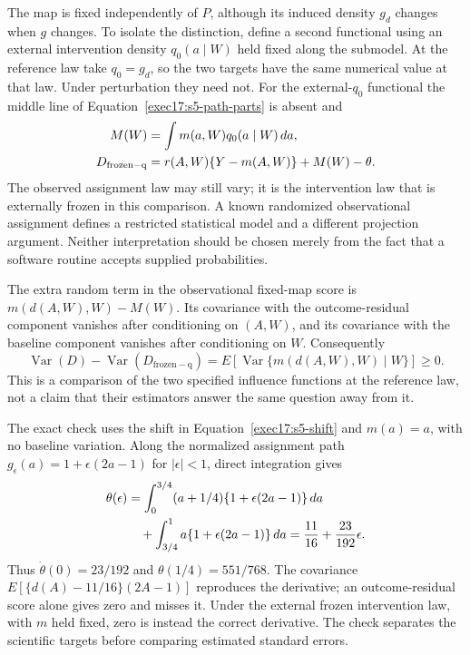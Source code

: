 The map is fixed independently of $P$, although its induced density $g_d$
changes when $g$ changes. To isolate the distinction, define a second
functional using an external intervention density $q_0(a\mid W)$ held fixed
along the submodel. At the reference law take $q_0=g_d$, so the two targets
have the same numerical value at that law. Under perturbation they need not.
For the external-$q_0$ functional the middle line of
Equation~\eqref{exec17:s5-path-parts} is absent and
\begin{align}
 M(W)&=\int m(a,W)q_0(a\mid W)\,da,\notag\\
 D_{\mathrm{frozen-q}}&=r(A,W)\{Y-m(A,W)\}+M(W)-\theta.
 \label{exec17:s5-frozen-if}
\end{align}
The observed assignment law may still vary; it is the intervention law that
is externally frozen in this comparison. A known randomized observational
assignment defines a restricted statistical model and a different
projection argument. Neither interpretation should be chosen merely from
the fact that a software routine accepts supplied probabilities.

The extra random term in the observational fixed-map score is
$m(d(A,W),W)-M(W)$. Its covariance with the outcome-residual component
vanishes after conditioning on $(A,W)$, and its covariance with the
baseline component vanishes after conditioning on $W$. Consequently
\begin{equation}
 \operatorname{Var}(D)-\operatorname{Var}(D_{\mathrm{frozen-q}})
 =E\!\left[\operatorname{Var}\{m(d(A,W),W)\mid W\}\right]\geq0.
 \label{exec17:s5-assignment-variance}
\end{equation}
This is a comparison of the two specified influence functions at the reference
law, not a claim that their estimators answer the same question away from it.

The exact check uses the shift in Equation~\eqref{exec17:s5-shift} and
$m(a)=a$, with no baseline variation. Along the normalized assignment path
$g_\epsilon(a)=1+\epsilon(2a-1)$ for $|\epsilon|<1$, direct integration gives
\begin{align}
 \theta(\epsilon)
 &=\int_0^{3/4}(a+1/4)\{1+\epsilon(2a-1)\}\,da\notag\\
 &\quad+\int_{3/4}^1 a\{1+\epsilon(2a-1)\}\,da
   =\frac{11}{16}+\frac{23}{192}\epsilon .
 \label{exec17:s5-assignment-path}
\end{align}
Thus $\dot\theta(0)=23/192$ and $\theta(1/4)=551/768$. The covariance
$E[\{d(A)-11/16\}(2A-1)]$ reproduces the derivative; an outcome-residual
score alone gives zero and misses it. Under the external frozen intervention
law, with $m$ held fixed, zero is instead the correct derivative. The check
separates the scientific targets before comparing estimated standard errors.

